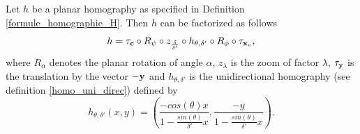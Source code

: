\begin{prop}
Let $h$ be a planar homography as specified in Definition \ref{formule_homographie_H}. Then $h$ can be factorized as follows
\begin{equation}
h = \tau_{\mathbf{c}}   \circ R_{\psi} \circ z_{\frac{\delta}{\delta'}} \circ h_{\theta,\delta'} \circ R_{\phi} \circ \tau_{\mathbf{x}_v},
\label{formul_decomp}
\end{equation}
where $R_\alpha$ denotes the planar rotation of angle $\alpha$, $z_\lambda$ is the zoom of factor $\lambda$, $\tau_{\mathbf{y}}$ is the translation by the vector $-\mathbf{y}$ and $h_{\theta,\delta'}$ is the unidirectional homography (see definition \ref{homo_uni_direc}) defined by
\begin{equation}
h_{\theta,\delta'}(x,y)=\left(\frac{-cos(\theta)x}{1-\frac{sin(\theta)}{\delta'}x} ,\frac{-y}{1-\frac{sin(\theta)}{\delta'}x}\right).
\label{mise_perspective}
\end{equation}
\label{prop_decomp}
\end{prop}








